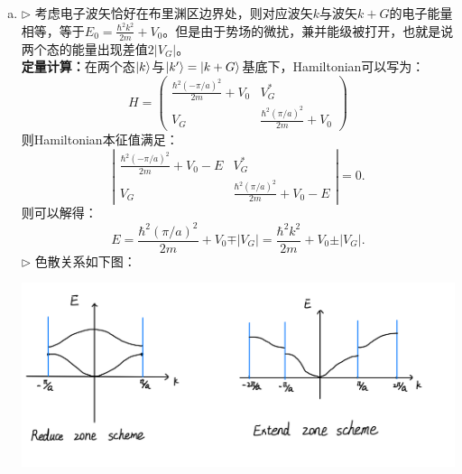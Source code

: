 \documentclass[reqno,a4paper,12pt]{amsart}
\begin{document}
\begin{enumerate}[1.]
\begin{tcolorbox}[breakable, colback = black!5!white, colframe = black]
\begin{enumerate}[(a)]
\item $\triangleright$ 考虑电子波矢恰好在布里渊区边界处，则对应波矢$k$与波矢$k+G$的电子能量相等，等于$E_0 = \frac{\hbar^2k^2}{2m}+V_0$。但是由于势场的微扰，兼并能级被打开，也就是说两个态的能量出现差值$2\vert V_G \vert$。 \\
\textbf{定量计算：}在两个态$\ket{k}$与$\ket{k'} = \ket{k+G}$基底下，Hamiltonian可以写为：
\[
	H = \begin{pmatrix}
		\frac{\hbar^2(-\pi/a)^2}{2m} + V_0 & V_G^* \\
		V_G & \frac{\hbar^2(\pi/a)^2}{2m}+V_0
	\end{pmatrix}
\]
则Hamiltonian本征值满足：
\[
	\left\vert \begin{matrix}
		\frac{\hbar^2(-\pi/a)^2}{2m} + V_0 - E & V_G^* \\
		V_G & \frac{\hbar^2(\pi/a)^2}{2m} + V_0 - E
	\end{matrix} \right\vert = 0.
\]
则可以解得：
\[
	E = \frac{\hbar^2(\pi/a)^2}{2m} + V_0 \mp \vert V_G \vert = \frac{\hbar^2k^2}{2m} + V_0 \pm \vert V_G \vert.
\]
$\triangleright$ 色散关系如下图：\\
\begin{centering}
	\includegraphics[scale = 0.17]{15.1.jpeg}
\end{centering}


\end{enumerate}
\end{tcolorbox}
\end{enumerate}
\end{document}
